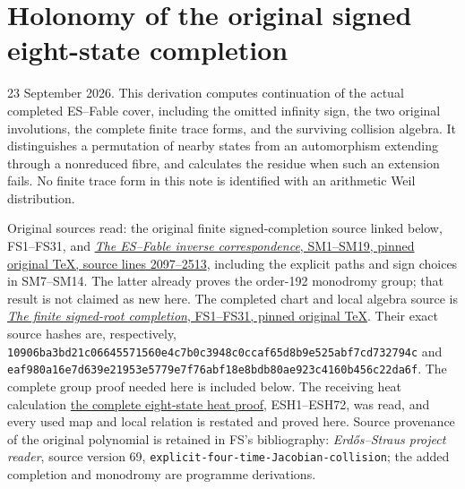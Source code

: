 \documentclass[
  10pt,
  a4paper,
]{article}
\author{}
\date{}
\begin{document}
{
\setcounter{tocdepth}{3}
\tableofcontents
}
\section{Holonomy of the original signed eight-state
completion}\label{holonomy-of-the-original-signed-eight-state-completion}

23 September 2026. This derivation computes continuation of the actual
completed ES--Fable cover, including the omitted infinity sign, the two
original involutions, the complete finite trace forms, and the surviving
collision algebra. It distinguishes a permutation of nearby states from
an automorphism extending through a nonreduced fibre, and calculates the
residue when such an extension fails. No finite trace form in this note
is identified with an arithmetic Weil distribution.

Original sources read: the original finite signed-completion source
linked below, FS1--FS31, and
\href{https://github.com/KokunoYumeto/zeta-function-research-reader/blob/ab45e221579a0d48ce2885b4ecdf1a6aefc24a20/workbenches/splitzero-tandem/continuations/20260920-fable-boundary-action/FABLE_TO_ORIGINAL_CONDUCTOR.tex\#L2097}{\emph{The
ES--Fable inverse correspondence}, SM1--SM19, pinned original TeX,
source lines 2097--2513}, including the explicit paths and sign choices
in SM7--SM14. The latter already proves the order-192 monodromy group;
that result is not claimed as new here. The completed chart and local
algebra source is
\href{https://github.com/KokunoYumeto/zeta-function-research-reader/blob/0fd693c844aad9117e30ec447c59864a28af10f3/workbenches/splitzero-tandem/continuations/20260921-native-spectral-real-pair/005/independent/FINITE_SIGNED_COMPLETION.tex}{\emph{The
finite signed-root completion}, FS1--FS31, pinned original TeX}. Their
exact source hashes are, respectively,
\texttt{10906ba3\allowbreak{}bd21c066\allowbreak{}45571560\allowbreak{}e4c7b0c3\allowbreak{}948c0cca\allowbreak{}f65d8b9e\allowbreak{}525abf7c\allowbreak{}d732794c}
and
\texttt{eaf980a1\allowbreak{}6e7d639e\allowbreak{}21953e57\allowbreak{}79e7f76a\allowbreak{}bf18e8bd\allowbreak{}b80ae923\allowbreak{}c4160b45\allowbreak{}6c22da6f}.
The complete group proof needed here is included below. The receiving
heat calculation
\href{https://github.com/KokunoYumeto/zeta-function-research-reader/blob/d5c9d198a8432e3ede468b280162a99c00e3f4f7/workbenches/splitzero-tandem/branches/tau-zero-prime-positivity/EIGHT_STATE_HEAT_COMPARISON.md}{the
complete eight-state heat proof}, ESH1--ESH72, was read, and every used
map and local relation is restated and proved here. Source provenance of
the original polynomial is retained in FS's bibliography:
\emph{Erdős--Straus project reader}, source version 69,
\texttt{explicit-\allowbreak{}four-\allowbreak{}time-\allowbreak{}Jacobian-\allowbreak{}collision}; the added completion and
monodromy are programme derivations.
\end{document}
